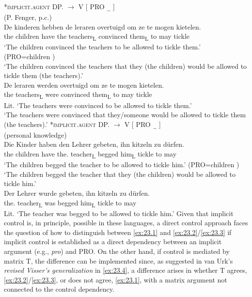 \documentclass[output=paper]{langsci/langscibook}
\begin{document}
\ea\label{ex:23.2} *\textsc{implicit.agent}  DP.\Acc{} $\to$ \Nom{}  V  [\textsubscript{\Inf{}}   PRO \textsubscript{ …}  ]\\
	\ea\label{ex:23.2a}  (P. Fenger, p.c.)\\
    \gll De kinderen  hebben  de leraren  overtuigd  om  ze  te mogen  kietelen.\\
		the children  have  the teachers\textsubscript{L}  convinced  \Comp{}  them\textsubscript{L}  to may  tickle\\
	\glt ‘The children convinced the teachers to be allowed to tickle them.’ (PRO=children )\\
		‘The children convinced the teachers that they (the children) would
    be allowed to tickle them (the teachers).’
    \ex\label{ex:23.2b}  \parencite[171, (10b)]{vanUrk2013}\\
    \gll \llap{*}De leraren  werden overtuigd  om ze  te mogen kietelen.\\
		the teachers\textsubscript{L}  were  convinced  \Comp{}  them\textsubscript{L}  to may  tickle\\
	\glt Lit. ‘The teachers were convinced to be allowed to tickle them.’\\
			‘The teachers were convinced that they/someone would be allowed to tickle them (the teachers).’
	\z
\ex\label{ex:23.3} *\textsc{implicit.agent}  DP.\Acc{} $\to$ \Nom{}  V  [\textsubscript{\Inf{}}  PRO \textsubscript{…}  ]\\
	\ea\label{ex:23.3a}  (personal knowledge)\\
		\gll Die Kinder  haben  den Lehrer  gebeten,  ihn  kitzeln  zu dürfen.\\
			the children  have  the.\Acc{} teacher\textsubscript{L}  begged  him\textsubscript{L}  tickle  to may\\
		\glt ‘The children begged the teacher to be allowed to tickle him.’ (PRO=children )\\
			‘The children begged the teacher that they (the children) would be allowed to tickle him.’
    \ex\label{ex:23.3b}  \parencite[171, \eqref{ex:23.10b}]{vanUrk2013}\\
        \gll \llap{*}Der Lehrer  wurde  gebeten,  ihn  kitzeln  zu dürfen.\\
			the.\Nom{} teacher\textsubscript{L}  was  begged  him\textsubscript{L}  tickle  to may\\
        \glt Lit. ‘The teacher was begged to be allowed to tickle him.’
	\z
\z
%
Given that implicit control is, in principle,
possible in these languages, a direct control approach faces the question of
how to distinguish between \eqref{ex:23.1} and
\eqref{ex:23.2}/\eqref{ex:23.3} if implicit control is established as a direct dependency between an implicit
argument (e.g., \emph{pro}) and PRO. On the other hand,
if control is mediated by matrix T, the difference can be implemented since, as
suggested in van Urk’s \emph{revised Visser’s generalization} in
\eqref{ex:23.4}, a difference arises in whether T agrees,
\eqref{ex:23.2}/\eqref{ex:23.3}, or does not agree,
\eqref{ex:23.1}, with a matrix argument not connected to the control
dependency.
\end{document}
